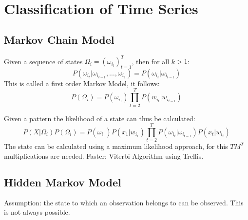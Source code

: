 \chapter{Classification of Time Series}
\section{Markov Chain Model}
Given a sequence of states $\Omega_i = {\left(\omega_{i_t}\right)}_{t=1}^T$, then for all $k>1$:
\begin{equation*}
    P(\omega_{i_t} | \omega_{i_{t-1}}, \ldots, \omega_{i_1}) = P(\omega_{i_t} | \omega_{i_{t-1}})
\end{equation*}
This is called a first order Markov Model, it follows:
\begin{equation*}
    P(\Omega_i) = P(\omega_{i_1}) \prod_{t=2}^T P(w_{i_t} | w_{i_{t-1}})
\end{equation*}

Given a pattern the likelihood of a state can thus be calculated:
\begin{equation*}
    P(X|\Omega_i)P(\Omega_i) = P(\omega_{i_1})P(x_1|w_{i_1}) \prod_{t=2}^T P(\omega_{i_t} | \omega_{i_{t-1}})P(x_t|w_{i_t})
\end{equation*}
The state can be calculated using a maximum likelihood approach, for this $TM^T$ multiplications are needed. Faster: Viterbi Algorithm using Trellis.

\section{Hidden Markov Model}
Assumption: the state to which an observation belongs to can be observed. This is not always possible.
